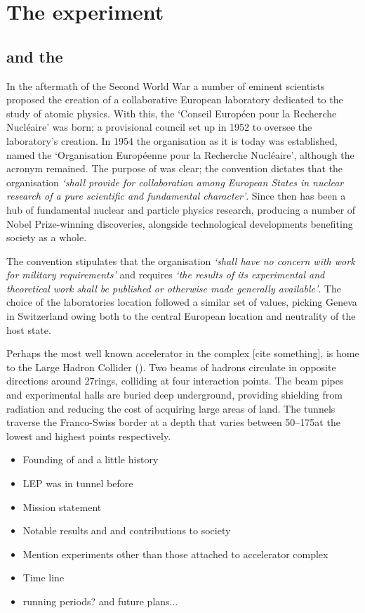 \chapter{The \lhcb experiment} 
\label{ch:detector}
\minitoc
 


\section{\cern and the \lhc}


In the aftermath of the Second World War a number of eminent scientists proposed the creation of a collaborative European laboratory dedicated to the study of atomic physics. With this, the `Conseil Europ\'een pour la Recherche Nucl\'eaire' was born; a provisional council set up in 1952 to oversee the laboratory's creation.  In 1954 the organisation as it is today was established, named the `Organisation Europ\'eenne pour la Recherche Nucl\'eaire', although the acronym \cern remained. 
The purpose of \cern was clear; the convention dictates that the organisation \emph{`shall provide for collaboration among European States in nuclear research of a pure scientific and fundamental character'}.
Since then \cern has been a hub of fundamental nuclear and particle physics research, producing a number of Nobel Prize-winning discoveries, alongside technological developments benefiting society as a whole.

The convention stipulates that the organisation \emph{`shall have no concern with work for military requirements'} and  
requires \emph{`the results of its experimental and theoretical work shall be published or otherwise made generally available'}. 
The choice of the laboratories location followed a similar set of values, picking Geneva in Switzerland owing both to the central European location and neutrality of the host state. 


Perhaps the most well known accelerator in the complex [cite something], \cern is home to the Large Hadron Collider (\lhc). Two beams of hadrons circulate in opposite directions around 27\km rings, colliding at four interaction points. The beam pipes and experimental halls are buried deep underground, providing shielding from radiation and reducing the cost of acquiring large areas of land. The tunnels traverse the Franco-Swiss border at a depth that varies between 50--175\m at the lowest and highest points respectively.      


{\color{Red}
\begin{itemize}
\item Founding of \cern and a little history 
\item LEP was in tunnel before
\item Mission statement
\item Notable results and and contributions to society
\item Mention experiments other than those attached to accelerator complex
\item Time line
\item running periods? and future plans...
\end{itemize}
}

